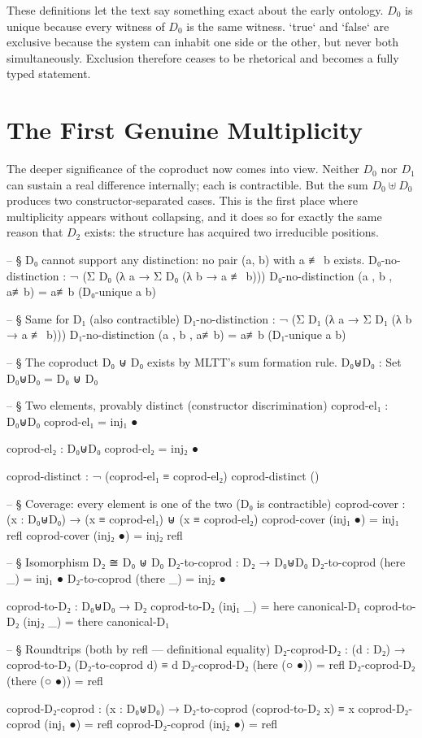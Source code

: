 \documentclass[11pt,a4paper]{book}
\begin{document}
These definitions let the text say something exact about the early ontology. $D_0$ is unique because every witness of $D_0$ is the same witness. `true` and `false` are exclusive because the system can inhabit one side or the other, but never both simultaneously. Exclusion therefore ceases to be rhetorical and becomes a fully typed statement.

\section{The First Genuine Multiplicity}

The deeper significance of the coproduct now comes into view. Neither $D_0$ nor $D_1$ can sustain a real difference internally; each is contractible. But the sum $D_0 \uplus D_0$ produces two constructor-separated cases. This is the first place where multiplicity appears without collapsing, and it does so for exactly the same reason that $D_2$ exists: the structure has acquired two irreducible positions.

\begin{code}

-- § D₀ cannot support any distinction: no pair (a, b) with a ≢ b exists.
D₀-no-distinction : ¬ (Σ D₀ (λ a → Σ D₀ (λ b → a ≢ b)))
D₀-no-distinction (a , b , a≢b) = a≢b (D₀-unique a b)

-- § Same for D₁ (also contractible)
D₁-no-distinction : ¬ (Σ D₁ (λ a → Σ D₁ (λ b → a ≢ b)))
D₁-no-distinction (a , b , a≢b) = a≢b (D₁-unique a b)

-- § The coproduct D₀ ⊎ D₀ exists by MLTT's sum formation rule.
D₀⊎D₀ : Set
D₀⊎D₀ = D₀ ⊎ D₀

-- § Two elements, provably distinct (constructor discrimination)
coprod-el₁ : D₀⊎D₀
coprod-el₁ = inj₁ ●

coprod-el₂ : D₀⊎D₀
coprod-el₂ = inj₂ ●

coprod-distinct : ¬ (coprod-el₁ ≡ coprod-el₂)
coprod-distinct ()

-- § Coverage: every element is one of the two (D₀ is contractible)
coprod-cover : (x : D₀⊎D₀) → (x ≡ coprod-el₁) ⊎ (x ≡ coprod-el₂)
coprod-cover (inj₁ ●) = inj₁ refl
coprod-cover (inj₂ ●) = inj₂ refl

-- § Isomorphism D₂ ≅ D₀ ⊎ D₀
D₂-to-coprod : D₂ → D₀⊎D₀
D₂-to-coprod (here  _) = inj₁ ●
D₂-to-coprod (there _) = inj₂ ●

coprod-to-D₂ : D₀⊎D₀ → D₂
coprod-to-D₂ (inj₁ _) = here  canonical-D₁
coprod-to-D₂ (inj₂ _) = there canonical-D₁

-- § Roundtrips (both by refl — definitional equality)
D₂-coprod-D₂ : (d : D₂) → coprod-to-D₂ (D₂-to-coprod d) ≡ d
D₂-coprod-D₂ (here  (○ ●)) = refl
D₂-coprod-D₂ (there (○ ●)) = refl

coprod-D₂-coprod : (x : D₀⊎D₀) → D₂-to-coprod (coprod-to-D₂ x) ≡ x
coprod-D₂-coprod (inj₁ ●) = refl
coprod-D₂-coprod (inj₂ ●) = refl
\end{code}
\end{document}
